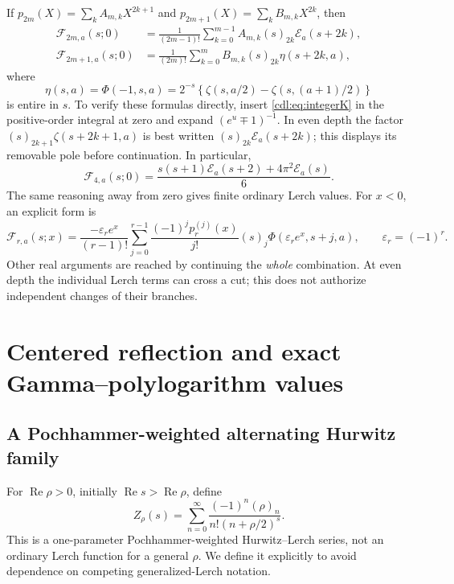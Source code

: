 \documentclass[11pt,letterpaper]{article}
\numberwithin{equation}{section}
\theoremstyle{definition}\newtheorem{definition}[theorem]{Definition}
\theoremstyle{remark}\newtheorem{remark}[theorem]{Remark}
\newcommand{\Rea}{\operatorname{Re}}\newcommand{\Ima}{\operatorname{Im}}
\newcommand{\F}{\mathcal F}\newcommand{\E}{\mathcal E}
\begin{document}
If
$p_{2m}(X)=\sum_k A_{m,k}X^{2k+1}$ and
$p_{2m+1}(X)=\sum_k B_{m,k}X^{2k}$, then
\begin{align}
 \F_{2m,a}(s;0)&=\frac1{(2m-1)!}\sum_{k=0}^{m-1}
 A_{m,k}(s)_{2k}\E_a(s+2k),\label{cdl:eq:evenbasis}\\
 \F_{2m+1,a}(s;0)&=\frac1{(2m)!}\sum_{k=0}^{m}
 B_{m,k}(s)_{2k}\eta(s+2k,a),\label{cdl:eq:oddbasis}
\end{align}
where
\begin{equation}\label{cdl:eq:eta}
 \eta(s,a)=\Phi(-1,s,a)
 =2^{-s}\left\{\zeta(s,a/2)-\zeta(s,(a+1)/2)\right\}
\end{equation}
is entire in $s$. To verify these formulas directly, insert
\eqref{cdl:eq:integerK} in the positive-order integral at zero and
expand $(e^u\mp1)^{-1}$. In even depth the factor
$(s)_{2k+1}\zeta(s+2k+1,a)$ is best written
$(s)_{2k}\E_a(s+2k)$; this displays its removable pole before
continuation. In particular,
\begin{equation}\label{cdl:eq:C4}
 \F_{4,a}(s;0)=\frac{s(s+1)\E_a(s+2)+4\pi^2\E_a(s)}6.
\end{equation}
The same reasoning away from zero gives finite ordinary Lerch values.
For $x<0$, an explicit form is
\begin{equation}\label{cdl:eq:finiteLerch}
 \F_{r,a}(s;x)=\frac{-\varepsilon_r e^x}{(r-1)!}
 \sum_{j=0}^{r-1}\frac{(-1)^jp_r^{(j)}(x)}{j!}
 (s)_j\Phi(\varepsilon_r e^x,s+j,a),\qquad
 \varepsilon_r=(-1)^r.
\end{equation}
Other real arguments are reached by continuing the \emph{whole}
combination. At even depth the individual Lerch terms can cross a cut;
this does not authorize independent changes of their branches.

\section{Centered reflection and exact Gamma--polylogarithm values}
\label{cdl:sec:reflection}

\subsection{A Pochhammer-weighted alternating Hurwitz family}
For $\Rea\rho>0$, initially $\Rea s>\Rea\rho$, define
\begin{equation}\label{cdl:eq:Zseries}
 Z_\rho(s)=\sum_{n=0}^\infty
 \frac{(-1)^n(\rho)_n}{n!(n+\rho/2)^s}.
\end{equation}
This is a one-parameter Pochhammer-weighted Hurwitz--Lerch series, not
an ordinary Lerch function for a general $\rho$. We define it explicitly
to avoid dependence on competing generalized-Lerch notation.
\end{document}

